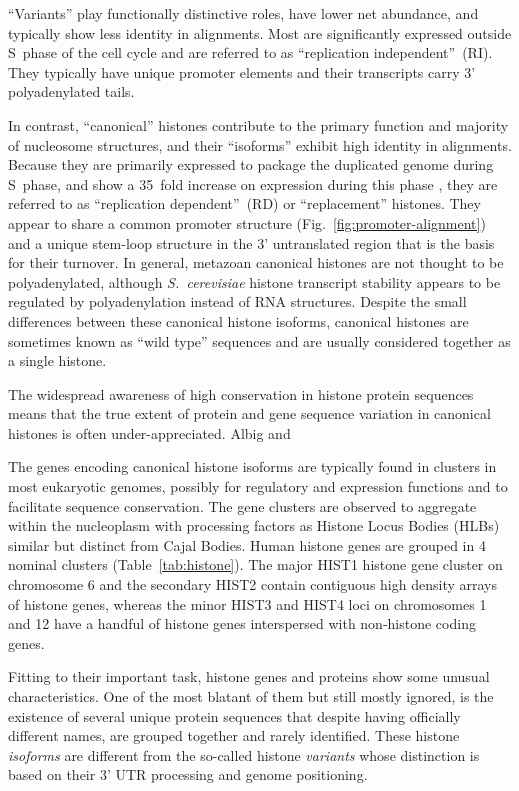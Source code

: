 \documentclass[10pt,a4paper]{article}
\newcommand{\think}[2][]{\todo[caption={#2}, size=\small, #1]{\renewcommand{\baselinestretch}{0.5}\selectfont#2\par}}
\begin{document}
    ``Variants'' play functionally distinctive roles, have lower net abundance, and typically show less
    identity in alignments. Most are significantly expressed outside S~phase of the cell cycle and are
    referred to as ``replication independent''~(RI). They typically have unique promoter elements and their
    transcripts carry 3' polyadenylated tails.

    In contrast, ``canonical'' histones contribute to the primary function and majority of nucleosome
    structures, and their ``isoforms'' exhibit high identity in alignments. Because they are primarily
    expressed to package the duplicated genome during S~phase, and show a 35~fold increase on expression
    during this phase \cite{harris-1991}, they are referred to as ``replication dependent''~(RD) or ``replacement''
    histones. They appear to share a common promoter structure (Fig.~\ref{fig:promoter-alignment}) and
    a unique stem-loop structure in the 3' untranslated region that is the
    basis for their turnover. In general, metazoan canonical histones
    are not thought to be polyadenylated, although \textit{S.\ cerevisiae} histone transcript stability
    appears to be regulated by polyadenylation instead of RNA structures. Despite the small differences between these canonical histone isoforms,
    canonical histones are sometimes known as ``wild type'' sequences and are usually considered together
    as a single histone.

    The widespread awareness of high conservation in histone protein sequences means that the true extent
    of protein and gene sequence variation in canonical histones is often under-appreciated. Albig and 


    The genes encoding canonical histone isoforms are typically found in clusters in most eukaryotic genomes,
    possibly for regulatory and expression functions and to facilitate sequence conservation. The gene clusters
    are observed to aggregate within the nucleoplasm with processing factors as Histone Locus Bodies
    (HLBs) similar but distinct from Cajal Bodies. Human histone genes are grouped in 4 nominal clusters
    (Table~\ref{tab:histone}). The major HIST1 histone gene cluster on chromosome 6 and the secondary
    HIST2 contain contiguous high density arrays of histone genes, whereas the minor HIST3 and HIST4
    loci on chromosomes 1 and 12 have a handful of histone genes interspersed with non-histone coding genes.


    Fitting to their important task, histone genes and proteins show some unusual characteristics.
    One of the most blatant of them but still mostly ignored, is the existence of several unique protein
    sequences \think{should explain better that we're not talking about SNP?} that despite having
    officially different names, are grouped together and rarely identified. These histone
    \emph{isoforms} are different from the so-called histone \emph{variants} whose distinction
    is based on their 3' UTR processing and genome positioning.
\end{document}
